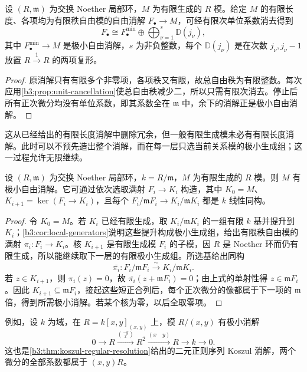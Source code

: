 \begin{corollary}\label{b3:cor:finite-resolution-splitting}
	设 \((R,\mathfrak m)\) 为交换 Noether 局部环，\(M\) 为有限生成的 \(R\) 模。给定 \(M\) 的有限长度、各项均为有限秩自由模的自由消解 \(F_\bullet\to M\)，可经有限次单位系数消去得到
	\[
		F_\bullet\cong F_\bullet^{\min}\oplus \bigoplus_{\nu=1}^s\mathbb D(j_\nu),
	\]
	其中 \(F_\bullet^{\min}\to M\) 是极小自由消解，\(s\) 为非负整数，每个 \(\mathbb D(j_\nu)\) 是在次数 \(j_\nu,j_\nu-1\) 放置 \(R\xrightarrow{1}R\) 的两项复形。
\end{corollary}
\begin{proof}
	原消解只有有限多个非零项，各项秩又有限，故总自由秩为有限整数。每次应用\cref{b3:prop:unit-cancellation}使总自由秩减少二，所以只需有限次消去。停止后所有正次微分均没有单位系数，即其系数全在 \(\mathfrak m\) 中，余下的消解正是极小自由消解。
\end{proof}

这从已经给出的有限长度消解中删除冗余，但一般有限生成模未必有有限长度消解。此时可以不预先造出整个消解，而在每一层只选当前关系模的极小生成组；这一过程允许无限继续。

\begin{proposition}\label{b3:prop:minimal-resolution-existence}
	设 \((R,\mathfrak m)\) 为交换 Noether 局部环，\(k=R/\mathfrak m\)，\(M\) 为有限生成的 \(R\) 模。则 \(M\) 有极小自由消解。它可通过依次选取满射 \(F_i\to K_i\) 构造，其中 \(K_0=M\)、\(K_{i+1}=\ker(F_i\to K_i)\)，且每个 \(F_i/\mathfrak mF_i\to K_i/\mathfrak mK_i\) 都是 \(k\) 线性同构。
\end{proposition}
\begin{proof}
	令 \(K_0=M\)。若 \(K_i\) 已经有限生成，取 \(K_i/\mathfrak mK_i\) 的一组有限 \(k\) 基并提升到 \(K_i\)；\cref{b3:cor:local-generators}说明这些提升构成极小生成组，给出有限秩自由模的满射 \(\pi_i:F_i\to K_i\)。核 \(K_{i+1}\) 是有限生成模 \(F_i\) 的子模，因 \(R\) 是 Noether 环而仍有限生成，所以能继续取下一层的有限极小生成组。所选基给出同构
	\[
		\overline{\pi_i}:F_i/\mathfrak mF_i\xrightarrow{\sim}K_i/\mathfrak mK_i.
	\]
	若 \(z\in K_{i+1}\)，则 \(\pi_i(z)=0\)，故 \(\overline{\pi_i}(z+\mathfrak mF_i)=0\)；由上式的单射性得 \(z\in\mathfrak mF_i\)。因此 \(K_{i+1}\subseteq\mathfrak mF_i\)，接起这些短正合列后，每个正次微分的像都属于下一项的 \(\mathfrak m\) 倍，得到所需极小消解。若某个核为零，以后全取零项。
\end{proof}

例如，设 \(k\) 为域，在 \(R=k[x,y]_{(x,y)}\) 上，模 \(R/(x,y)\) 有极小消解
\[
	0\longrightarrow R\xrightarrow{\binom{-y}{x}}R^2 \xrightarrow{(x\quad y)}R\longrightarrow k\longrightarrow0.
\]
这也是\cref{b3:thm:koszul-regular-resolution}给出的二元正则序列 Koszul 消解，两个微分的全部系数都属于 \((x,y)R\)。

